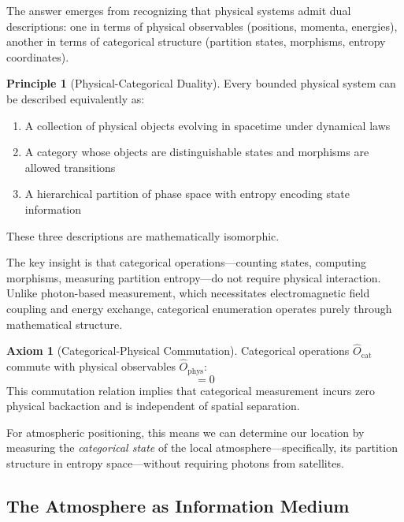 \documentclass[twocolumn,10pt,a4paper]{article}
\theoremstyle{definition}
\newtheorem{axiom}[theorem]{Axiom}
\newtheorem{principle}[theorem]{Principle}
\theoremstyle{remark}
\begin{document}
The answer emerges from recognizing that physical systems admit dual descriptions: one in terms of physical observables (positions, momenta, energies), another in terms of categorical structure (partition states, morphisms, entropy coordinates).

\begin{principle}[Physical-Categorical Duality]
\label{prin:duality}
Every bounded physical system can be described equivalently as:
\begin{enumerate}
    \item A collection of physical objects evolving in spacetime under dynamical laws
    \item A category whose objects are distinguishable states and morphisms are allowed transitions
    \item A hierarchical partition of phase space with entropy encoding state information
\end{enumerate}
These three descriptions are mathematically isomorphic.
\end{principle}

The key insight is that categorical operations—counting states, computing morphisms, measuring partition entropy—do not require physical interaction. Unlike photon-based measurement, which necessitates electromagnetic field coupling and energy exchange, categorical enumeration operates purely through mathematical structure.

\begin{axiom}[Categorical-Physical Commutation]
\label{ax:commutation}
Categorical operations $\hat{O}_{\text{cat}}$ commute with physical observables $\hat{O}_{\text{phys}}$:
\begin{equation}
    [\hat{O}_{\text{cat}}, \hat{O}_{\text{phys}}] = 0
\end{equation}
This commutation relation implies that categorical measurement incurs zero physical backaction and is independent of spatial separation.
\end{axiom}

For atmospheric positioning, this means we can determine our location by measuring the \textit{categorical state} of the local atmosphere—specifically, its partition structure in entropy space—without requiring photons from satellites.

\subsection{The Atmosphere as Information Medium}
\end{document}
